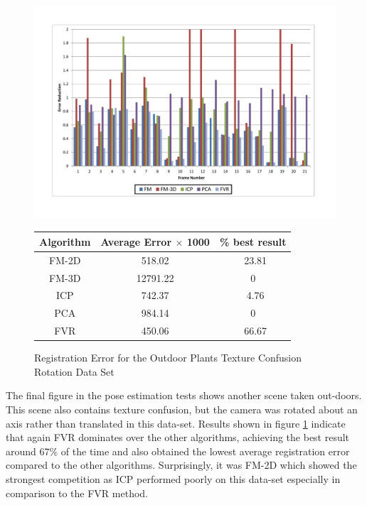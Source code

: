 \begin{figure}
\centering
\includegraphics[width=6in]{images/results/Plants_Outdoors_Texture_Confusion_Rotation}
\caption{Registration Error for the Outdoor Plants Texture Confusion Rotation Data Set}
\label{fig:PET17}

\begin{tabular}{ccc}
\hline
\textbf{Algorithm} & \textbf{Average Error $\times$ 1000} & \textbf{\% best result}\\ \hline
FM-2D	& 518.02 & ~23.81\\
FM-3D	& 12791.22 & 0\\
ICP		& 742.37 & ~4.76\\
PCA		& 984.14 & 0\\
FVR		& 450.06 & ~66.67\\
\end{tabular}
\end{figure}


The final figure in the pose estimation tests shows another scene taken out-doors. This scene also contains texture confusion, but the camera was rotated about an axis rather than translated in this data-set. Results shown in figure \ref{fig:PET17} indicate that again FVR dominates over the other algorithms, achieving the best result around 67\% of the time and also obtained the lowest average registration error compared to the other algorithms. Surprisingly, it was FM-2D which showed the strongest competition as ICP performed poorly on this data-set especially in comparison to the FVR method. \\


